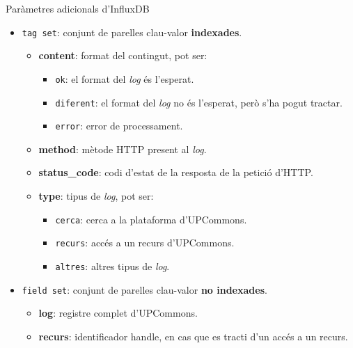 \begin{frame}{Paràmetres adicionals d'InfluxDB}
    \begin{itemize}%
        \item \texttt{tag set}: conjunt de parelles clau-valor \textbf{indexades}.
        \begin{itemize}
            \item \textbf{content}: format del contingut, pot ser:
            \begin{itemize}
                \item \texttt{ok}: el format del \textit{log} és l'esperat.
                \item \texttt{diferent}: el format del \textit{log} no és l'esperat, però s'ha pogut tractar.
                \item \texttt{error}: error de processament.
            \end{itemize}
            \item \textbf{method}: mètode HTTP present al \textit{log}.
            \item \textbf{status\_code}: codi d'estat de la resposta de la petició d'HTTP.
            \item \textbf{type}: tipus de \textit{log}, pot ser:
            \begin{itemize}
                \item \texttt{cerca}: cerca a la plataforma d'UPCommons.
                \item \texttt{recurs}: accés a un recurs d'UPCommons.
                \item \texttt{altres}: altres tipus de \textit{log}.
            \end{itemize}
        \end{itemize}
        \item \texttt{field set}: conjunt de parelles clau-valor \textbf{no indexades}.
        \begin{itemize}
            \item \textbf{log}: registre complet d'UPCommons.
            \item \textbf{recurs}: identificador handle, en cas que es tracti d'un accés a un recurs.
        \end{itemize}
    \end{itemize}
\end{frame}


